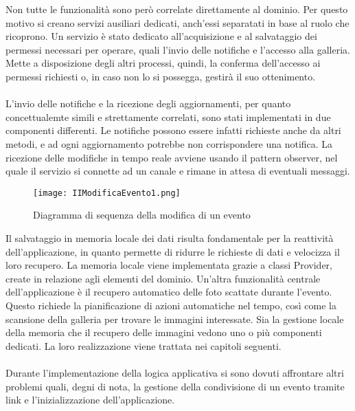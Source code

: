 Non tutte le funzionalità sono però correlate direttamente al dominio.
Per questo motivo si creano servizi ausiliari dedicati, 
anch'essi separatati in base al ruolo che ricoprono.
\clearpage
Un servizio è stato dedicato all'acquisizione e al salvataggio dei permessi necessari per operare, 
quali l'invio delle notifiche e l'accesso alla galleria. 
Mette a disposizione degli altri processi, quindi, la conferma dell'accesso ai permessi richiesti o, 
in caso non lo si possegga, gestirà il suo ottenimento.\\ 
\\
L'invio delle notifiche e la ricezione degli aggiornamenti, 
per quanto concettualemte simili e strettamente correlati,
sono stati implementati in due componenti differenti. 
Le notifiche possono essere infatti richieste anche da altri metodi, 
e ad ogni aggiornamento potrebbe non corrispondere una notifica.
La ricezione delle modifiche in tempo reale avviene usando il pattern observer, 
nel quale il servizio si connette ad un canale e rimane in attesa di eventuali messaggi.

\begin{figure}[h!]
    \begin{center}
        \texttt{[image: IIModificaEvento1.png]}
        \caption{Diagramma di sequenza della modifica di un evento}
    \end{center}
\end{figure}

\clearpage

Il salvataggio in memoria locale dei dati risulta fondamentale per la reattività dell'applicazione,
in quanto permette di ridurre le richieste di dati e velocizza il loro recupero.
La memoria locale viene implementata grazie a classi Provider, create in relazione agli elementi del dominio.
Un'altra funzionalità centrale dell'applicazione è il recupero automatico 
delle foto scattate durante l'evento. 
Questo richiede la pianificazione di azioni automatiche nel tempo,
così come la scansione della galleria per trovare le immagini interessate.
Sia la gestione locale della memoria che il recupero delle immagini vedono uno o più componenti dedicati.
La loro realizzazione viene trattata nei capitoli seguenti.\\
\\
Durante l'implementazione della logica applicativa si sono dovuti affrontare altri problemi quali, degni di nota, 
la gestione della condivisione di un evento tramite link e l'inizializzazione dell'applicazione.\\

